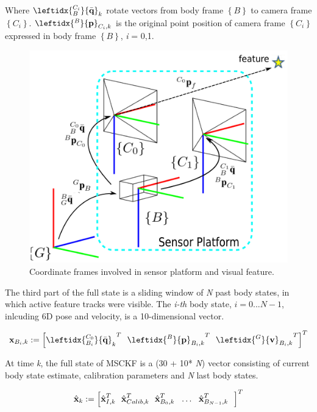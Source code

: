 \documentclass[a4paper, 10pt, conference]{ieeeconf}      %
\begin{document}
Where $ {\leftidx{_B^{C_i}}{\bar{\textbf q}}_k} $ rotate vectors from body frame  $\left\lbrace B \right\rbrace$ to camera frame  $\left\lbrace C_i \right\rbrace$. $ {\leftidx{^B}{\textbf p}_{C_i,k}} $ is the original point position of camera frame  $\left\lbrace C_i \right\rbrace$ expressed in body frame  $\left\lbrace B \right\rbrace$, \emph i = 0,1.
\begin{figure}[thpb]
	\centering
	
	\includegraphics[scale=0.5]{frames2.png}
	
	\caption{Coordinate frames involved in sensor platform and visual feature.}
	\label{figurelabel}
\end{figure}

The third part of the full state is a sliding window of \emph N past body states, in which active feature tracks were visible. The \emph {i-th }body state, $ i = 0...N-1 $, inlcuding 6D pose and velocity, is a 10-dimensional vector. 
 
\begin {equation}
\textbf x_{B_i,k} :=\left[  {\leftidx{_{B_i}^{C_0}}{\bar{\textbf q}}_k}^{ T} \ \
{\leftidx{^B}{\textbf p}_{B_i,k}}^T \ \
{\leftidx{^G}{\textbf v}_{B_i,k}}^T
\right]^T
\end{equation}


At time \emph k, the full state of MSCKF is a (30 + 10* \emph N)  vector consisting of  current body state estimate, calibration parameters and \emph N 
last body states.

\begin {equation}
 \hat {\textbf x}_k :=\left[  {{\hat{\textbf x}}_{I,k}}^{ T} \ \
 {{\hat{\textbf x}}_{Calib,k}}^{ T} \ \
 {{\hat{\textbf x}}_{B_0,k}}^{ T}  \ \
 \ldots \ \
  {{\hat{\textbf x}}_{B_{N-1},k}}^{ T}  \ \
\right]^T
\end{equation}
\end{document}
